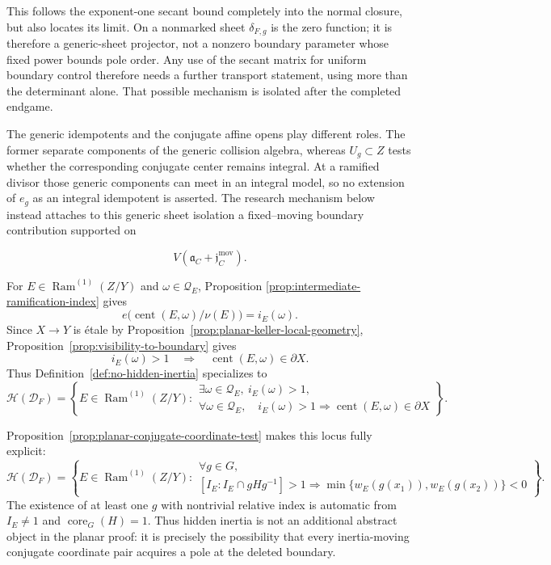 \documentclass[11pt]{article}
\theoremstyle{remark}
\theoremstyle{definition}
\DeclareMathOperator{\Ram}{Ram}
\DeclareMathOperator{\core}{core}
\begin{document}
This follows the exponent-one secant bound completely into the normal
closure, but also locates its limit.  On a nonmarked sheet
\(\delta_{F,g}\) is the zero function; it is therefore a generic-sheet
projector, not a nonzero boundary parameter whose fixed power bounds pole
order.  Any use of the secant matrix for uniform boundary control therefore
needs a further transport statement, using more than the determinant alone.
That possible mechanism is isolated after the completed endgame.

The generic idempotents and the conjugate affine opens play different
roles.  The former separate components of the generic collision algebra,
whereas \(U_g\subset Z\) tests whether the corresponding conjugate center
remains integral.  At a ramified divisor those generic components can meet
in an integral model, so no extension of \(e_g\) as an integral idempotent is
asserted.  The research mechanism below instead attaches to this generic
sheet isolation a fixed--moving boundary contribution supported on

\[
  V\!\left(\mathfrak a_C+\mathfrak j_C^{\mathrm{mov}}\right).
\]

For \(E\in\Ram^{(1)}(Z/Y)\) and
\(\omega\in\mathcal Q_E\), Proposition
\ref{prop:intermediate-ramification-index} gives
\[
  e\bigl(\operatorname{cent}(E,\omega)/\nu(E)\bigr)=i_E(\omega).
\]
Since \(X\to Y\) is \'etale by
Proposition~\ref{prop:planar-keller-local-geometry},
Proposition~\ref{prop:visibility-to-boundary} gives
\[
  i_E(\omega)>1
  \quad\Longrightarrow\quad
  \operatorname{cent}(E,\omega)\in\partial X.
\]
Thus Definition~\ref{def:no-hidden-inertia} specializes to
\[
  \mathcal H(\mathcal D_F)
  =
  \left\{
  E\in\Ram^{(1)}(Z/Y):
  \begin{array}{l}
    \exists\omega\in\mathcal Q_E,\ i_E(\omega)>1,\\
    \forall\omega\in\mathcal Q_E,\quad
      i_E(\omega)>1
      \Longrightarrow
      \operatorname{cent}(E,\omega)\in\partial X
  \end{array}
  \right\}.
\]

Proposition~\ref{prop:planar-conjugate-coordinate-test} makes this locus
fully explicit:
\[
  \mathcal H(\mathcal D_F)
  =
  \left\{
  E\in\Ram^{(1)}(Z/Y):
  \begin{array}{l}
    \forall g\in G,\\[-2pt]
    [I_E:I_E\cap gHg^{-1}]>1
    \Longrightarrow
    \min\{w_E(g(x_1)),w_E(g(x_2))\}<0
  \end{array}
  \right\}.
\]
The existence of at least one \(g\) with nontrivial relative index is
automatic from \(I_E\neq1\) and \(\core_G(H)=1\).  Thus hidden inertia is
not an additional abstract object in the planar proof: it is precisely the
possibility that every inertia-moving conjugate coordinate pair acquires a
pole at the deleted boundary.
\end{document}
